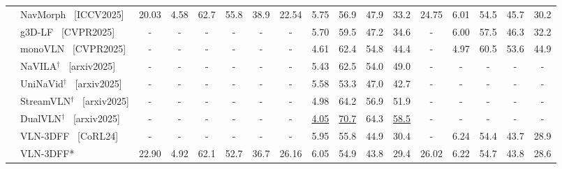 \documentclass{article}
\theoremstyle{plain}
\theoremstyle{definition}
\theoremstyle{remark}
\begin{document}
\begin{table}[thpb]
{\begin{threeparttable}
\begin{tabular}{@{}c|l|ccccccccccccccc@{}}
            \multicolumn{1}{c|}{} & NavMorph~\cite{Yao2025navmorph} {\scriptsize {\color{Gray} [ICCV2025]}} & 20.03 & 4.58 & 62.7 & 55.8 & \multicolumn{1}{c|}{38.9} & 22.54 & 5.75 & 56.9 & 47.9 & \multicolumn{1}{c|}{33.2} & 24.75 & 6.01 & 54.5 & 45.7 & 30.2 \\
            \multicolumn{1}{c|}{} & g3D-LF~\cite{wang2025g3d} {\scriptsize {\color{Gray} [CVPR2025]}}& - & - & - & - & \multicolumn{1}{c|}{-} & - & 5.70 & 59.5 & 47.2 &\multicolumn{1}{c|}{34.6} & - & 6.00 & 57.5 & 46.3 & 32.2 \\   
            \multicolumn{1}{c|}{} & monoVLN~\cite{Lu2025monoVLN} {\scriptsize {\color{Gray} [CVPR2025]}}& - & - & - & - & \multicolumn{1}{c|}{-} & - & 4.61 & 62.4 & 54.8 &\multicolumn{1}{c|}{44.4} & - & 4.97 & 60.5 & 53.6 & 44.9 \\
             \multicolumn{1}{c|}{} & NaVILA$^\dagger$~\cite{cheng2024navila} {\scriptsize {\color{Gray} [arxiv2025]}}& - & - & - & - & \multicolumn{1}{c|}{-} & - & 5.43 & 62.5 & 54.0 &\multicolumn{1}{c|}{49.0} & - & - & - & - & - \\ 
            \multicolumn{1}{c|}{} & UniNaVid$^\dagger$~\cite{zhang2024navid} {\scriptsize {\color{Gray} [arxiv2025]}}& - & - & - & - & \multicolumn{1}{c|}{-} & - & 5.58 & 53.3 & 47.0 &\multicolumn{1}{c|}{42.7} & - & - & - & - & - \\  
            \multicolumn{1}{c|}{} & StreamVLN$^\dagger$~\cite{wei2025streamvln} {\scriptsize {\color{Gray} [arxiv2025]}}& - & - & - & - & \multicolumn{1}{c|}{-} & - & 4.98 & 64.2 & 56.9 &\multicolumn{1}{c|}{51.9} & - & - & - & - & - \\ 
            \multicolumn{1}{c|}{} & DualVLN$^\dagger$~\cite{wei2025ground}{\scriptsize {\color{Gray} [arxiv2025]}}& - & - & - & - & \multicolumn{1}{c|}{-} & - & \underline{4.05} & \underline{70.7} & 64.3 &\multicolumn{1}{c|}{\underline{58.5}} & - & - & - & - & - \\
               \cmidrule(l){2-17} 
            \multicolumn{1}{c|}{} & VLN-3DFF~\cite{wang2024sim} {\scriptsize {\color{Gray} [CoRL24]}}& - & - & - & - & \multicolumn{1}{c|}{-} & - & 5.95 & 55.8 & 44.9 & \multicolumn{1}{c|}{30.4} & - & 6.24 & 54.4 & 43.7 & 28.9 \\
			\multicolumn{1}{c|}{} & \cellcolor{gray!5}VLN-3DFF* & \cellcolor{gray!5}22.90 & \cellcolor{gray!5}4.92 & \cellcolor{gray!5}62.1 & \cellcolor{gray!5}52.7 & \multicolumn{1}{c|}{\cellcolor{gray!5}36.7} & \cellcolor{gray!5}26.16 & \cellcolor{gray!5}6.05 & \cellcolor{gray!5}54.9 & \cellcolor{gray!5}43.8 & \multicolumn{1}{c|}{\cellcolor{gray!5}29.4} & \cellcolor{gray!5}26.02 & \cellcolor{gray!5}6.22 & \cellcolor{gray!5}54.7 & \cellcolor{gray!5}43.8 & \cellcolor{gray!5}28.6 \\

\end{tabular}
\end{threeparttable}}
\end{table}
\end{document}
